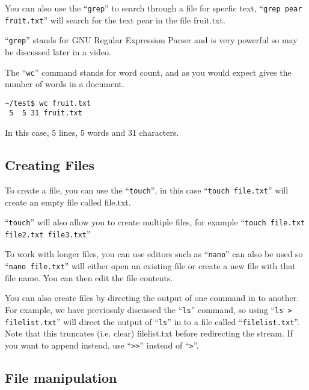 \documentclass{extbook}
\begin{document}
You can also use the ``\verb|grep|'' to search through a file for specfic text, 
``\verb|grep pear fruit.txt|'' will search for the text pear in the file fruit.txt.   

``\verb|grep|'' stands for GNU Regular Expression Parser and is very powerful so may be discussed later in a video. 

The ``\verb|wc|'' command stands for word count, and as you would expect gives the number of words in a document.

\begin{verbatim}
~/test$ wc fruit.txt 
 5  5 31 fruit.txt
\end{verbatim}

In this case,  5 lines, 5 words and 31 characters. 



\subsection{Creating Files}

To create a file, you can use the ``\verb|touch|'', in this case ``\verb|touch file.txt|'' will create an empty file called file.txt.

``\verb|touch|'' will also allow you to create multiple files, for example ``\verb|touch file.txt file2.txt file3.txt|''

To work with longer files, you can use editors such as ``\verb|nano|'' can also be used so ``\verb|nano file.txt|'' will either open an existing file or create a new file with that file name.   You can then edit the file contents.

You can also create files by directing the output of one command in to another.  For example, we have previosuly discussed the ``\verb|ls|'' command, so using ``\verb|ls > filelist.txt|'' will direct the output of ``\verb|ls|'' in to a file called ``\verb|filelist.txt|''.  Note that this truncates (i.e. clear) filelist.txt before redirecting the stream.  If you want to append instead, use ``\verb|>>|'' instead of ``\verb|>|''.


\subsection{File manipulation}
\end{document}
